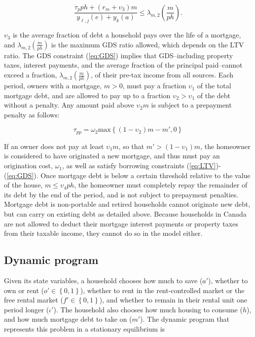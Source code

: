 \documentclass[parskip=full]{article}
\begin{document}
\begin{equation}\label{eq:GDS}
\frac{\tau_{p}ph+(r_{m}+\upsilon_{3})m}{y_{\ell,j}(e)+y_{k}(a)} \leq \lambda_{m,2}\left(\frac{m}{ph}\right).
\end{equation}

\noindent $\upsilon_{3}$ is the average fraction of debt a household pays over the life of a mortgage, and $\lambda_{m,2}\left(\frac{m}{ph}\right)$ is the maximum GDS ratio allowed, which depends on the LTV ratio. The GDS constraint (\ref{eq:GDS}) implies that GDS--including property taxes, interest payments, and the average fraction of the principal paid--cannot exceed a fraction, $\lambda_{m,2}\left(\frac{m}{ph}\right)$, of their pre-tax income from all sources. Each period, owners with a mortgage, $m>0$, must pay a fraction $\upsilon_{1}$ of the total mortgage debt, and are allowed to pay up to a fraction $\upsilon_{2}>\upsilon_{1}$ of the debt without a penalty. Any amount paid above $\upsilon_{2}m$ is subject to a prepayment penalty as follows: 

\begin{equation}\label{eq:prepayment_penalty}
\tau_{pp}=\omega_{2}\mbox{max}\left\{(1-\upsilon_{2})m-m',0\right\}
\end{equation}

\noindent If an owner does not pay at least $\upsilon_{1}m$, so that $m'>(1-\upsilon_{1})m$, the homeowner is considered to have originated a new mortgage, and thus must pay an origination cost, $\omega_{1}$, as well as satisfy borrowing constraints (\ref{eq:LTV})-(\ref{eq:GDS}). Once mortgage debt is below a certain threshold relative to the value of the house, $m \leq \upsilon_{4}ph$, the homeowner must completely repay the remainder of its debt by the end of the period, and is not subject to prepayment penalties. Mortgage debt is non-portable and retired households cannot originate new debt, but can carry on existing debt as detailed above. Because households in Canada are not allowed to deduct their mortgage interest payments or property taxes from their taxable income, they cannot do so in the model either.

\subsection{Dynamic program}\label{subsection:household_optimization}
Given its state variables, a household chooses how much to save ($a'$), whether to own or rent ($o' \in \left\{0,1\right\}$), whether to rent in the rent-controlled market or the free rental market ($f' \in \left\{0,1\right\}$), and whether to remain in their rental unit one period longer ($\iota'$). The household also chooses how much housing to consume ($h$), and how much mortgage debt to take on ($m'$). The dynamic program that represents this problem in a stationary equilibrium is
\end{document}
